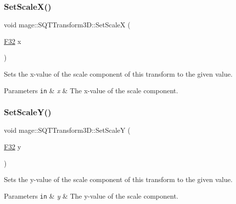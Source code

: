 \subsubsection{\texorpdfstring{Set\+Scale\+X()}{SetScaleX()}}
{\footnotesize\ttfamily void mage\+::\+S\+Q\+T\+Transform3\+D\+::\+Set\+ScaleX (\begin{DoxyParamCaption}\item[{\mbox{\hyperlink{namespacemage_aa97e833b45f06d60a0a9c4fc22ae02c0}{F32}}}]{x }\end{DoxyParamCaption})\hspace{0.3cm}{\ttfamily [noexcept]}}

Sets the x-\/value of the scale component of this transform to the given value.


\begin{DoxyParams}[1]{Parameters}
\mbox{\tt in}  & {\em x} & The x-\/value of the scale component. \\
\hline
\end{DoxyParams}
\mbox{\label{classmage_1_1_s_q_t_transform3_d_afbbf32e1e79478d5be5f78dc07a1ab64}} 
\subsubsection{\texorpdfstring{Set\+Scale\+Y()}{SetScaleY()}}
{\footnotesize\ttfamily void mage\+::\+S\+Q\+T\+Transform3\+D\+::\+Set\+ScaleY (\begin{DoxyParamCaption}\item[{\mbox{\hyperlink{namespacemage_aa97e833b45f06d60a0a9c4fc22ae02c0}{F32}}}]{y }\end{DoxyParamCaption})\hspace{0.3cm}{\ttfamily [noexcept]}}

Sets the y-\/value of the scale component of this transform to the given value.


\begin{DoxyParams}[1]{Parameters}
\mbox{\tt in}  & {\em y} & The y-\/value of the scale component. \\
\hline
\end{DoxyParams}
\mbox{\label{classmage_1_1_s_q_t_transform3_d_a84cbecec5d0abcbbeeae1a6ed4c09239}} 
